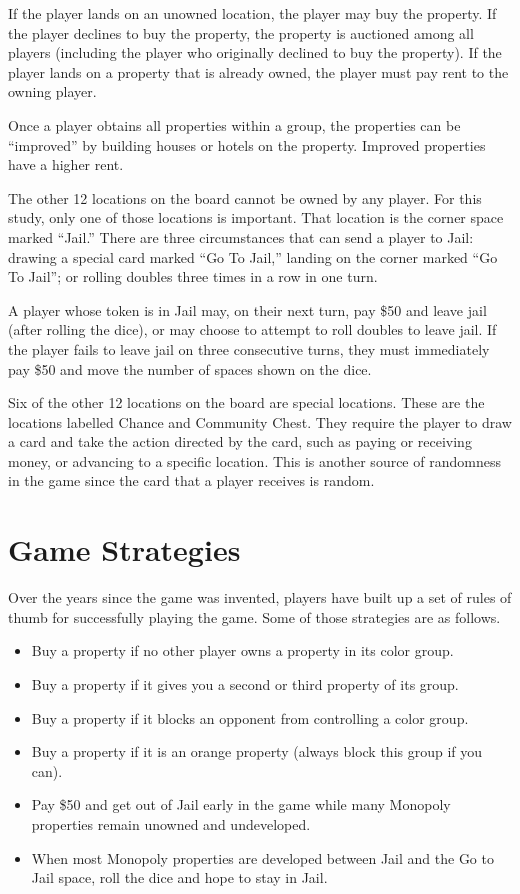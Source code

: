 If the player lands on an unowned location, the player may buy the property. If
the player declines to buy the property, the property is auctioned among all
players (including the player who originally declined to buy the property).
If the player lands on a property that is already owned, the player must pay
rent to the owning player.

Once a player obtains all properties within a group, the properties can be
``improved'' by building houses or hotels on the property. Improved properties
have a higher rent.

The other 12 locations on the board cannot be owned by any player. For this
study, only one of those locations is important. That location is the corner
space marked ``Jail.'' There are three circumstances that can send a player to
Jail: drawing a special card marked ``Go To Jail,'' landing on the corner marked
``Go To Jail''; or rolling doubles three times in a row in one turn.

A player whose token is in Jail may, on their next turn, pay \$50 and leave jail
(after rolling the dice), or may choose to attempt to roll doubles to leave
jail. If the player fails to leave jail on three consecutive turns, they must
immediately pay \$50 and move the number of spaces shown on the dice.

Six of the other 12 locations on the board are special locations. These are the
locations labelled Chance and Community Chest. They require the player to draw a
card and take the action directed by the card, such as paying or receiving
money, or advancing to a specific location. This is another source of randomness
in the game since the card that a player receives is random.

\section{Game Strategies} \label{m_gamestrategies}
Over the years since the game was invented, players have built up a set of rules
of thumb for successfully playing the game. Some of those strategies are as
follows.

\begin{itemize}
  \item {Buy a property if no other player owns a property in its color group.}
  \item {Buy a property if it gives you a second or third property of its
  group.}
  \item {Buy a property if it blocks an opponent from controlling a color
  group.}
  \item {Buy a property if it is an orange property (always block this group if
  you can).}
  \item {Pay \$50 and get out of Jail early in the game while many Monopoly
  properties remain unowned and undeveloped.}
  \item {When most Monopoly properties are developed between Jail and the Go to
  Jail space, roll the dice and hope to stay in Jail.}
\end{itemize}